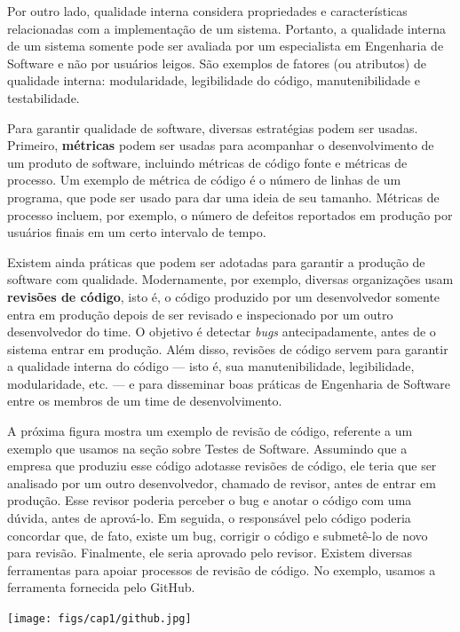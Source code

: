 \documentclass[
  11pt,
  twoside]{book}
\let\origfigure\figure
\let\endorigfigure\endfigure
\renewenvironment{figure}[1][2] {
    \expandafter\origfigure\expandafter[!h]
} {
    \endorigfigure
}
\begin{document}
 Por outro lado, qualidade interna
considera propriedades e características relacionadas com a
implementação de um sistema. Portanto, a qualidade interna de um sistema
somente pode ser avaliada por um especialista em Engenharia de Software
e não por usuários leigos. São exemplos de fatores (ou atributos) de
qualidade interna: modularidade, legibilidade do código,
manutenibilidade e testabilidade.

Para garantir qualidade de software, diversas estratégias podem ser
usadas. Primeiro, \textbf{métricas} podem ser usadas para acompanhar o
desenvolvimento de um produto de software, incluindo métricas de código
fonte e métricas de processo. Um exemplo de métrica de código é o número
de linhas de um programa, que pode ser usado para dar uma ideia de seu
tamanho. Métricas de processo incluem, por exemplo, o número de defeitos
reportados em produção por usuários finais em um certo intervalo de
tempo.

 Existem ainda práticas que podem ser adotadas
para garantir a produção de software com qualidade. Modernamente, por
exemplo, diversas organizações usam \textbf{revisões de código}, isto é,
o código produzido por um desenvolvedor somente entra em produção depois
de ser revisado e inspecionado por um outro desenvolvedor do time. O
objetivo é detectar \emph{bugs} antecipadamente, antes de o sistema
entrar em produção. Além disso, revisões de código servem para garantir
a qualidade interna do código --- isto é, sua manutenibilidade,
legibilidade, modularidade, etc. --- e para disseminar boas práticas de
Engenharia de Software entre os membros de um time de desenvolvimento.

A próxima figura mostra um exemplo de revisão de código, referente a um
exemplo que usamos na seção sobre Testes de Software. Assumindo que a
empresa que produziu esse código adotasse revisões de código, ele teria
que ser analisado por um outro desenvolvedor, chamado de revisor, antes
de entrar em produção. Esse revisor poderia perceber o bug e anotar o
código com uma dúvida, antes de aprová-lo. Em seguida, o responsável
pelo código poderia concordar que, de fato, existe um bug, corrigir o
código e submetê-lo de novo para revisão. Finalmente, ele seria aprovado
pelo revisor. Existem diversas ferramentas para apoiar processos de
revisão de código. No exemplo, usamos a ferramenta fornecida pelo
GitHub.

\begin{figure}
\centering
\texttt{[image: figs/cap1/github.jpg]}
\caption{Exemplo de revisão de código}
\end{figure}
\end{document}
